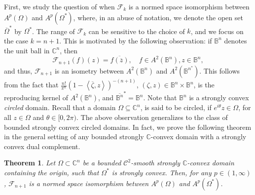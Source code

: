 \documentclass[11pt, oneside, reqno]{amsart}
\numberwithin{equation}{section}
\newtheorem{theorem}{Theorem}[section]
\theoremstyle{definition}
\newcommand{\bes} {\begin{equation*}}
\newcommand{\ees} {\end{equation*}}
\newcommand{\cont}{\mathcal C}
\newcommand{\C}{\mathbb C}
\newcommand{\Cn}{{\mathbb{C}^n}}
\newcommand{\ltt}{\left(}
\newcommand{\rtt}{\right)}
\newcommand{\Om}{\Omega}
\begin{document}
First, we study the question of when $\mathcal F_k$ is a normed space isomorphism between $A^p(\Om)$ and $A^p\left(\Om^*\right)$, where, in an abuse of notation, we denote the open set $\overline\Om^*$ by $\Om^*$. The range of $\mathcal F_k$ can be sensitive to the choice of $k$, and we focus on the case $k=n+1$. This is motivated by the following observation: if $\mathbb B^n$ denotes the unit ball in $\Cn$, then
\bes
\mathcal F_{n+1}\ltt f\rtt(z)=\overline{f(\overline{z})},\quad f\in A^2\ltt\mathbb B^n\rtt, z\in \mathbb B^n, 
\ees
and thus, $\mathcal{F}_{n+1}$ is an isometry between $A^2(\mathbb B^n)$ and $A^2\ltt\mathbb B^{n^*}\rtt$. This follows from the fact that $\frac{n!}{\pi^n}\ltt1-\left\langle\overline{\zeta},z\right\rangle\rtt^{-(n+1)}$, $\ltt\zeta,z\rtt\in \mathbb B^n\times\mathbb B^n$, is the reproducing kernel of $A^2(\mathbb B^n)$, and $\overline{\mathbb B^n}^*=\mathbb B^n$. {Note that $\mathbb B^n$ is a strongly convex {\em circled} domain. Recall that a domain $\Om\subseteq\C^n$, is said to be circled, if $e^{i\theta}z \in \Omega$, for all $z \in \Omega$ and $\theta \in [0, 2\pi)$. The above observation generalizes to the class of bounded strongly convex circled domains. In fact, we prove the following theorem in the general setting of any bounded strongly $\C$-convex domain with a strongly convex dual complement.}
\begin{theorem}\label{th:main1}
    Let $\Om\subset\C^n$ be a bounded $\cont^2$-smooth strongly $\C$-convex domain containing the origin, such that $\Om^*$ is strongly convex. Then, for any $p\in(1,\infty)$, $\mathcal{F}_{n+1}$ is a normed space isomorphism between $A^p\ltt\Om\rtt$ and $A^p\ltt\Om^*\rtt$. 
\end{theorem}
\end{document}
